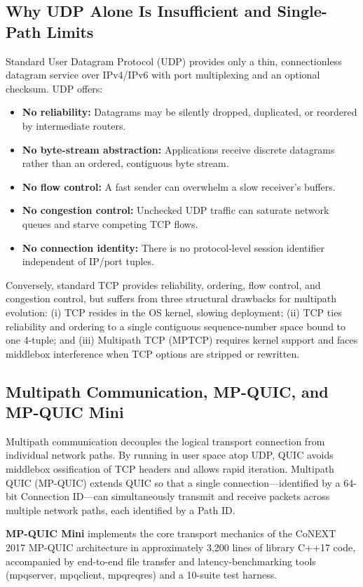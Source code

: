 \documentclass[10pt,a4paper]{article}
\newcommand{\codeul}{\textunderscore\hspace{0pt}}
\DeclareRobustCommand{\code}[1]{{\ttfamily\let\_\codeul #1}}
\begin{document}
\subsection{Why UDP Alone Is Insufficient and Single-Path Limits}
Standard User Datagram Protocol (UDP) provides only a thin, connectionless datagram service over IPv4/IPv6 with port multiplexing and an optional checksum. UDP offers:
\begin{itemize}
    \item \textbf{No reliability:} Datagrams may be silently dropped, duplicated, or reordered by intermediate routers.
    \item \textbf{No byte-stream abstraction:} Applications receive discrete datagrams rather than an ordered, contiguous byte stream.
    \item \textbf{No flow control:} A fast sender can overwhelm a slow receiver's buffers.
    \item \textbf{No congestion control:} Unchecked UDP traffic can saturate network queues and starve competing TCP flows.
    \item \textbf{No connection identity:} There is no protocol-level session identifier independent of IP/port tuples.
\end{itemize}

Conversely, standard TCP provides reliability, ordering, flow control, and congestion control, but suffers from three structural drawbacks for multipath evolution: (i) TCP resides in the OS kernel, slowing deployment; (ii) TCP ties reliability and ordering to a single contiguous sequence-number space bound to one 4-tuple; and (iii) Multipath TCP (MPTCP) requires kernel support and faces middlebox interference when TCP options are stripped or rewritten.

\subsection{Multipath Communication, MP-QUIC, and MP-QUIC Mini}
Multipath communication decouples the logical transport connection from individual network paths. By running in user space atop UDP, QUIC avoids middlebox ossification of TCP headers and allows rapid iteration. Multipath QUIC (MP-QUIC) extends QUIC so that a single connection—identified by a 64-bit Connection ID—can simultaneously transmit and receive packets across multiple network paths, each identified by a Path ID.

\textbf{MP-QUIC Mini} implements the core transport mechanics of the CoNEXT 2017 MP-QUIC architecture in approximately 3,200 lines of library C++17 code, accompanied by end-to-end file transfer and latency-benchmarking tools (\code{mpq\_server}, \code{mpq\_client}, \code{mpq\_reqres}) and a 10-suite test harness.
\end{document}
